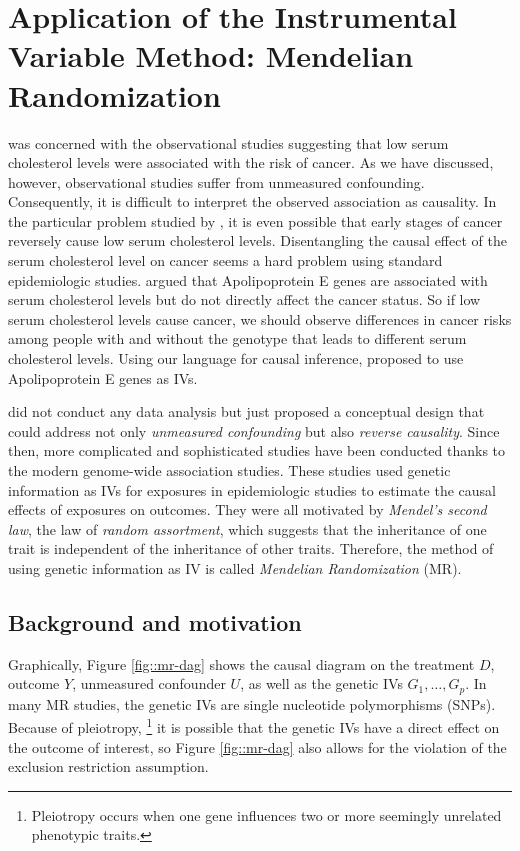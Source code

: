  
\chapter{Application of the Instrumental Variable Method: Mendelian Randomization}
 \label{chapter::iv-mr}




\citet{katan1986apoupoprotein} was concerned with the observational studies suggesting that low serum cholesterol levels were associated with the risk of cancer. As we have discussed, however, observational studies suffer from unmeasured confounding. Consequently, it is difficult to interpret the observed association as causality. In the particular problem studied by \citet{katan1986apoupoprotein}, it is even possible that early stages of cancer reversely cause low serum cholesterol levels. Disentangling the causal effect of the serum cholesterol level on cancer seems a hard problem using standard epidemiologic studies. \citet{katan1986apoupoprotein} argued that Apolipoprotein E genes are associated with serum cholesterol levels but do not directly affect the cancer status. So if low serum cholesterol levels cause cancer, we should observe differences in cancer risks among people with and without the genotype that leads to different serum cholesterol levels. Using our language for causal inference, \citet{katan1986apoupoprotein}  proposed to use Apolipoprotein E genes as IVs. 


\citet{katan1986apoupoprotein} did not conduct any data analysis but just proposed a conceptual design that could address not only {\it unmeasured confounding} but also {\it reverse causality}. Since then, more complicated and sophisticated studies have been conducted thanks to the modern genome-wide association studies. These studies used genetic information as IVs for exposures in epidemiologic studies to estimate the causal effects of exposures on outcomes. They were all motivated by {\it Mendel's second law}, the law of {\it random assortment}, which suggests that the inheritance of one trait is independent of the inheritance of other traits. Therefore, the method of using genetic information as IV is called {\it Mendelian Randomization} (MR). 


\section{Background and motivation}

Graphically, Figure \ref{fig::mr-dag} shows the causal diagram on the treatment $D$, outcome $Y$, unmeasured confounder $U$, as well as the genetic IVs $G_1, \ldots, G_p$. In many MR studies, the genetic IVs are single nucleotide polymorphisms (SNPs). Because of pleiotropy, \footnote{Pleiotropy occurs when one gene influences two or more seemingly unrelated phenotypic traits. } it is possible that the genetic IVs have a direct effect on the outcome of interest, so Figure \ref{fig::mr-dag} also allows for the violation of the exclusion restriction assumption.  

